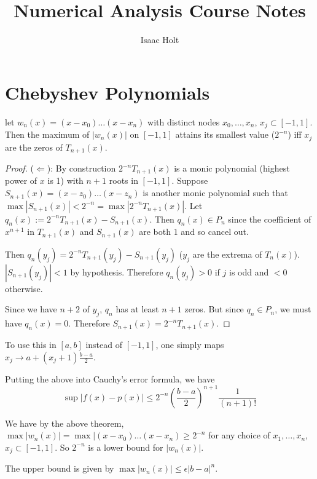 

\title{Numerical Analysis Course Notes}
\author{Isaac Holt}





\section{Chebyshev Polynomials}

\begin{theorem}
let $w_n(x) = (x - x_0) \dots (x - x_n)$ with distinct nodes ${x_0, \dots, x_n}$, $x_j \subset [-1, 1]$. Then the maximum of $|w_n(x)|$ on $[-1, 1]$ attains its smallest value ($2^{-n}$) iff ${x_j}$ are the zeros of $T_{n + 1}(x)$.
\end{theorem}

\begin{proof}
	($\Longleftarrow$): By construction $2^{-n} T_{n+1}(x)$ is a monic polynomial (highest power of $x$ is 1) with $n + 1$ roots in $[-1, 1]$. Suppose $S_{n+1}(x) = (x - z_0)\dots(x - z_n)$ is another monic polynomial such that $\max |S_{n+1}(x)| < 2^{-n} = \max |2^{-n} T_{n+1}(x)|$. Let $q_n(x) := 2^{-n} T_{n+1}(x) - S_{n+1}(x)$. Then $q_n(x) \in P_n$ since the coefficient of $x^{n+1}$ in $T_{n+1}(x)$ and $S_{n+1}(x)$ are both $1$ and so cancel out.

	Then $q_n(y_j) = 2^{-n} T_{n+1}(y_j) - S_{n+1}(y_j)$ ($y_j$ are the extrema of $T_n(x)$). $|S_{n+1}(y_j)| < 1$ by hypothesis. Therefore $q_n(y_j) > 0$ if $j$ is odd and $< 0$ otherwise.

	Since we have $n+2$ of $y_j$, $q_n$ has at least $n+1$ zeros. But since $q_n \in P_n$, we must have $q_n(x)=0$. Therefore $S_{n+1}(x) = 2^{-n} T_{n+1}(x)$. 
\end{proof}

\begin{remark}
	To use this in $[a, b]$ instead of $[-1, 1]$, one simply maps $x_j \rightarrow a + (x_j + 1) \frac{b - a}{2}$.
\end{remark}

\begin{remark}
	Putting the above into Cauchy's error formula,
	we have \[\sup |f(x)-p(x)| \le 2^{-n} {(\frac{b - a}{2})}^{n + 1} \frac{1}{(n + 1)!}\]
\end{remark}

\begin{remark}
	We have by the above theorem, $\max |w_n(x)| = \max |(x - x_0)\dots(x - x_n) \ge 2^{-n}$ for any choice of ${x_1, \dots, x_n}$, $x_j \subset [-1, 1]$. So $2^{-n}$ is a lower bound for $|w_n(x)|$.

	The upper bound is given by $\max |w_n(x)| \le \epsilon |b-a|^n$. 
\end{remark}


